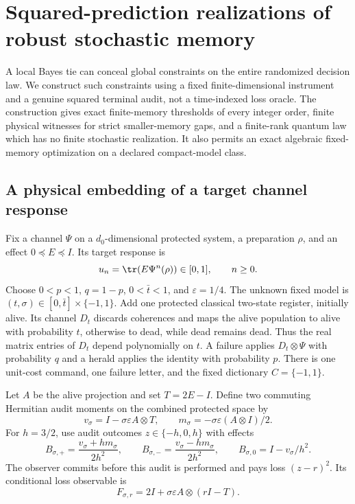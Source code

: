 \section{Squared-prediction realizations of robust stochastic memory}\label{sec:robust-randomization}
A local Bayes tie can conceal global constraints on the entire randomized decision law. We construct such constraints using a fixed finite-dimensional instrument and a genuine squared terminal audit, not a time-indexed loss oracle. The construction gives exact finite-memory thresholds of every integer order, finite physical witnesses for strict smaller-memory gaps, and a finite-rank quantum law which has no finite stochastic realization. It also permits an exact algebraic fixed-memory optimization on a declared compact-model class.

\subsection{A physical embedding of a target channel response}
Fix a channel $\Psi$ on a $d_0$-dimensional protected system, a preparation $\rho$, and an effect $0\preccurlyeq E\preccurlyeq I$. Its target response is
\[
 u_n=\tr(E\Psi^n(\rho))\in[0,1],\qquad n\ge0.
\]
Choose $0<p<1$, $q=1-p$, $0<\bar t<1$, and $\varepsilon=1/4$. The unknown fixed model is $(t,\sigma)\in[0,\bar t]\times\{-1,1\}$. Add one protected classical two-state register, initially alive. Its channel $D_t$ discards coherences and maps the alive population to alive with probability $t$, otherwise to dead, while dead remains dead. Thus the real matrix entries of $D_t$ depend polynomially on $t$. A failure applies $D_t\otimes\Psi$ with probability $q$ and a herald applies the identity with probability $p$. There is one unit-cost command, one failure letter, and the fixed dictionary $C=\{-1,1\}$.

Let $A$ be the alive projection and set $T=2E-I$. Define two commuting Hermitian audit moments on the combined protected space by
\[
 v_\sigma=I-\sigma\varepsilon A\otimes T,
 \qquad m_\sigma=-\sigma\varepsilon(A\otimes I)/2.
\]
For $h=3/2$, use audit outcomes $z\in\{-h,0,h\}$ with effects
\begin{equation}\label{eq:r67-audit-povm}
 B_{\sigma,+}=\frac{v_\sigma+hm_\sigma}{2h^2},\qquad
 B_{\sigma,-}=\frac{v_\sigma-hm_\sigma}{2h^2},\qquad
 B_{\sigma,0}=I-v_\sigma/h^2.
\end{equation}
The observer commits before this audit is performed and pays loss $(z-r)^2$. Its conditional loss observable is
\begin{equation}\label{eq:r67-embedded-loss}
 F_{\sigma,r}=2I+\sigma\varepsilon A\otimes(rI-T).
\end{equation}

